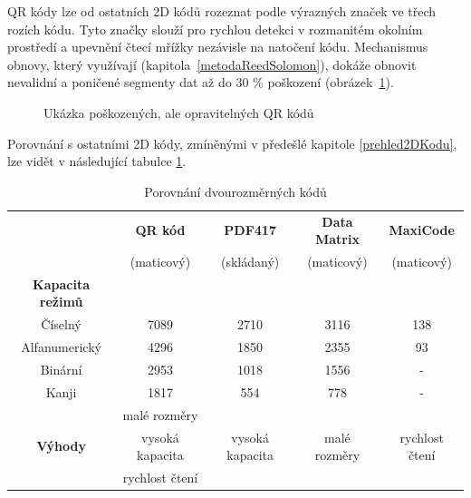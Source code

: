 QR kódy lze od ostatních 2D kódů rozeznat podle výrazných značek ve třech rozích 
kódu. Tyto značky slouží pro rychlou detekci v rozmanitém okolním prostředí a 
upevnění čtecí mřížky nezávisle na natočení kódu. Mechanismus obnovy, který 
využívají (kapitola~\ref{metodaReedSolomon}), dokáže obnovit nevalidní a
poničené segmenty dat až do 30 \% poškození (obrázek~\ref{corruptedQRCodes}).   

\begin{figure}[H]
  \begin{center}
    \caption{Ukázka poškozených, ale opravitelných QR kódů}
    \label{corruptedQRCodes}
  \end{center}
\end{figure}

Porovnání s ostatními 2D kódy, zmíněnými v předešlé kapitole
\ref{prehled2DKodu}, lze vidět v následující tabulce \ref{porovnani2DKodu}.

\begin{table}[H]
  \begin{center} 
    \begin{tabular}{| c | c | c | c | c |} \hline
     & \textbf{QR kód} & \textbf{PDF417} & \textbf{Data Matrix} &
     \textbf{MaxiCode} \\
     & (maticový) & (skládaný) & (maticový) & (maticový) \\ \hline
    \textbf{Kapacita režimů} & & & & \\ \hline
    Číselný& 7089 & 2710 & 3116 & 138 \\ \hline
    Alfanumerický & 4296 & 1850 & 2355 & 93 \\ \hline
    Binární & 2953 & 1018 & 1556 & - \\ \hline
    Kanji & 1817 & 554 & 778 & - \\ \hline
     & malé rozměry & \multirow{3}{*}{vysoká kapacita} & \multirow{3}{*}{malé 
     rozměry} & \multirow{3}{*}{rychlost čtení} \\
    \textbf{Výhody} & vysoká kapacita &  &  &  \\
     &rychlost čtení &  &  &  \\ \hline
    \end{tabular}
    \caption{Porovnání dvourozměrných kódů \cite{aboutQRCOde}}
    \label{porovnani2DKodu}
  \end{center}
\end{table}

